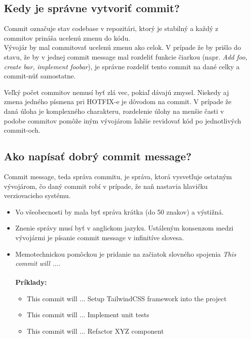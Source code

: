 \documentclass{article}
\begin{document}
        \vspace*{.25cm}
        \subsection*{Kedy je správne vytvoriť commit?}

            \textnormal{%
            Commit označuje stav codebase v repozitári, ktorý je stabilný a každý z commitov prináša ucelenú zmenu do kódu. \\
            Vývojár by mal commitovať ucelenú zmenu ako celok. V prípade že by prišlo do stavu, že by v jednej commit message mal rozdeliť funkcie čiarkou (napr. \emph{Add foo, create bar, implement foobar}), je správne rozdeliť tento commit na dané celky a commit-núť samostatne. \\
            }

            \noindent \textnormal{%
            Veľký počet commitov nemusí byť zlá vec, pokiaľ dávajú zmysel. Niekedy aj zmena jedného písmena pri HOTFIX-e je dôvodom na commit. V prípade že daná úloha je komplexného charakteru, rozdelenie úlohy na menšie časti v podobe commitov pomôže iným vývojárom ľahšie revidovať kód po jednotlivých commit-och.
            }

        \vspace*{.5cm}
        \subsection*{Ako napísať dobrý commit message?}

            \textnormal{Commit message, teda správa commitu, je správa, ktorá vysvetľuje ostatným vývojárom, čo daný commit robí v prípade, že naň nastavia hlavičku verziovacieho systému.}

            \begin{itemize}
                \item Vo všeobecnosti by mala byť správa krátka (do 50 znakov) a výstižná.
                \item Znenie správy musí byť v anglickom jazyku. Ustáleným konsenzom medzi vývojármi je písanie commit message v infinitíve slovesa.
                \item Memotechnickou pomôckou je pridanie na začiatok slovného spojenia \emph{This commit will ...}.\\\\
                \textbf{Príklady:}
                \begin{itemize}
                    \item This commit will ... Setup TailwindCSS framework into the project
                    \item This commit will ... Implement unit tests
                    \item This commit will ... Refactor XYZ component
                \end{itemize}
            \end{itemize}
\end{document}
